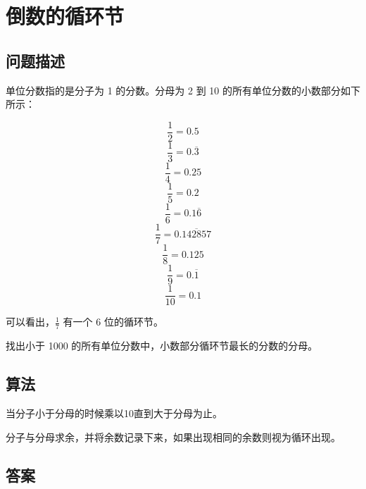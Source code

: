 \section{倒数的循环节}
\subsection{问题描述}
\begin{tcolorbox}
单位分数指的是分子为 1 的分数。分母为 2 到 10 的所有单位分数的小数部分如下所示：

\[
\frac{1}{2} = 0.5
\]
\[
\frac{1}{3} = 0.\overline{3}
\]
\[
\frac{1}{4} = 0.25
\]
\[
\frac{1}{5} = 0.2
\]
\[
\frac{1}{6} = 0.1\overline{6}
\]
\[
\frac{1}{7} = 0.\overline{142857}
\]
\[
\frac{1}{8} = 0.125
\]
\[
\frac{1}{9} = 0.\overline{1}
\]
\[
\frac{1}{10} = 0.1
\]

可以看出，\( \frac{1}{7} \) 有一个 6 位的循环节。

找出小于 1000 的所有单位分数中，小数部分循环节最长的分数的分母。
\end{tcolorbox}

\subsection{算法}
当分子小于分母的时候乘以10直到大于分母为止。

分子与分母求余，并将余数记录下来，如果出现相同的余数则视为循环出现。

\subsection{答案}
